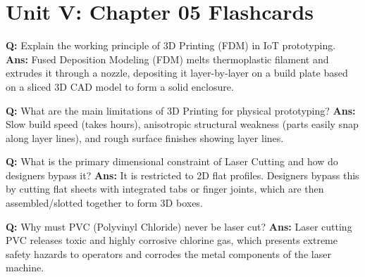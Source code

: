 \documentclass[10pt,a4paper,twocolumn]{article}
\begin{document}
\section*{Unit V: Chapter 05 Flashcards}

\begin{tcolorbox}[
  colback=white,
  colframe=UnitColorFive,
  colbacktitle=gray!10!white,
  coltitle=black,
  fonttitle=\bfseries\sffamily\small,
  title={Unit V $\bullet$ Card 1},
  boxrule=1.2pt,
  arc=2mm,
  outer arc=2mm,
  boxsep=1.5mm,
  top=1mm,
  bottom=1mm,
  left=1.5mm,
  right=1.5mm,
  before skip=2.5mm,
  after skip=2.5mm
]
\textbf{Q:} Explain the working principle of 3D Printing (FDM) in IoT prototyping.
\tcbline
\textbf{Ans:} Fused Deposition Modeling (FDM) melts thermoplastic filament and extrudes it through a nozzle, depositing it layer-by-layer on a build plate based on a sliced 3D CAD model to form a solid enclosure.
\end{tcolorbox}


\begin{tcolorbox}[
  colback=white,
  colframe=UnitColorFive,
  colbacktitle=gray!10!white,
  coltitle=black,
  fonttitle=\bfseries\sffamily\small,
  title={Unit V $\bullet$ Card 2},
  boxrule=1.2pt,
  arc=2mm,
  outer arc=2mm,
  boxsep=1.5mm,
  top=1mm,
  bottom=1mm,
  left=1.5mm,
  right=1.5mm,
  before skip=2.5mm,
  after skip=2.5mm
]
\textbf{Q:} What are the main limitations of 3D Printing for physical prototyping?
\tcbline
\textbf{Ans:} Slow build speed (takes hours), anisotropic structural weakness (parts easily snap along layer lines), and rough surface finishes showing layer lines.
\end{tcolorbox}


\begin{tcolorbox}[
  colback=white,
  colframe=UnitColorFive,
  colbacktitle=gray!10!white,
  coltitle=black,
  fonttitle=\bfseries\sffamily\small,
  title={Unit V $\bullet$ Card 3},
  boxrule=1.2pt,
  arc=2mm,
  outer arc=2mm,
  boxsep=1.5mm,
  top=1mm,
  bottom=1mm,
  left=1.5mm,
  right=1.5mm,
  before skip=2.5mm,
  after skip=2.5mm
]
\textbf{Q:} What is the primary dimensional constraint of Laser Cutting and how do designers bypass it?
\tcbline
\textbf{Ans:} It is restricted to 2D flat profiles. Designers bypass this by cutting flat sheets with integrated tabs or finger joints, which are then assembled/slotted together to form 3D boxes.
\end{tcolorbox}


\begin{tcolorbox}[
  colback=white,
  colframe=UnitColorFive,
  colbacktitle=gray!10!white,
  coltitle=black,
  fonttitle=\bfseries\sffamily\small,
  title={Unit V $\bullet$ Card 4},
  boxrule=1.2pt,
  arc=2mm,
  outer arc=2mm,
  boxsep=1.5mm,
  top=1mm,
  bottom=1mm,
  left=1.5mm,
  right=1.5mm,
  before skip=2.5mm,
  after skip=2.5mm
]
\textbf{Q:} Why must PVC (Polyvinyl Chloride) never be laser cut?
\tcbline
\textbf{Ans:} Laser cutting PVC releases toxic and highly corrosive chlorine gas, which presents extreme safety hazards to operators and corrodes the metal components of the laser machine.
\end{tcolorbox}
\end{document}
